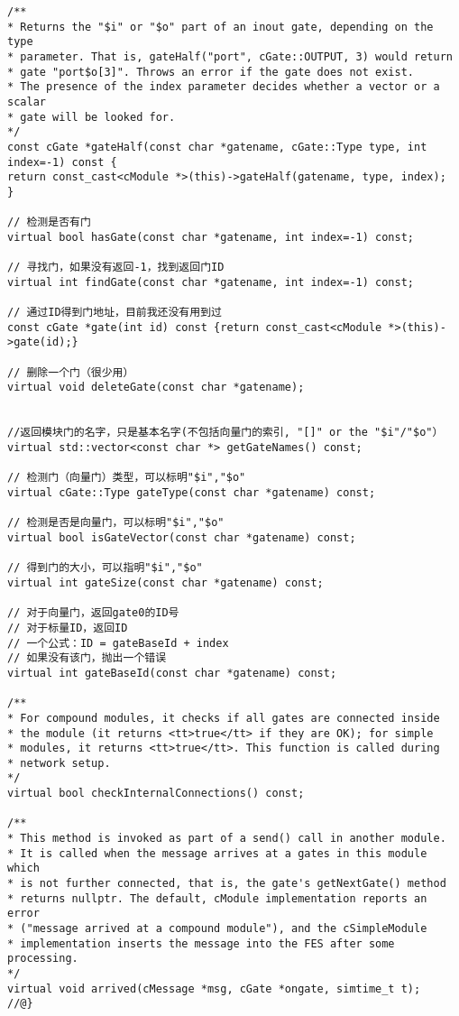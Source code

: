 \begin{lstlisting}
/**
* Returns the "$i" or "$o" part of an inout gate, depending on the type
* parameter. That is, gateHalf("port", cGate::OUTPUT, 3) would return
* gate "port$o[3]". Throws an error if the gate does not exist.
* The presence of the index parameter decides whether a vector or a scalar
* gate will be looked for.
*/
const cGate *gateHalf(const char *gatename, cGate::Type type, int index=-1) const {
return const_cast<cModule *>(this)->gateHalf(gatename, type, index);
}

// 检测是否有门
virtual bool hasGate(const char *gatename, int index=-1) const;

// 寻找门，如果没有返回-1，找到返回门ID
virtual int findGate(const char *gatename, int index=-1) const;

// 通过ID得到门地址，目前我还没有用到过
const cGate *gate(int id) const {return const_cast<cModule *>(this)->gate(id);}

// 删除一个门（很少用）
virtual void deleteGate(const char *gatename);


//返回模块门的名字，只是基本名字(不包括向量门的索引, "[]" or the "$i"/"$o"）
virtual std::vector<const char *> getGateNames() const;

// 检测门（向量门）类型，可以标明"$i","$o"
virtual cGate::Type gateType(const char *gatename) const;

// 检测是否是向量门，可以标明"$i","$o"
virtual bool isGateVector(const char *gatename) const;

// 得到门的大小，可以指明"$i","$o"
virtual int gateSize(const char *gatename) const;

// 对于向量门，返回gate0的ID号
// 对于标量ID，返回ID
// 一个公式：ID = gateBaseId + index
// 如果没有该门，抛出一个错误
virtual int gateBaseId(const char *gatename) const;

/**
* For compound modules, it checks if all gates are connected inside
* the module (it returns <tt>true</tt> if they are OK); for simple
* modules, it returns <tt>true</tt>. This function is called during
* network setup.
*/
virtual bool checkInternalConnections() const;

/**
* This method is invoked as part of a send() call in another module.
* It is called when the message arrives at a gates in this module which
* is not further connected, that is, the gate's getNextGate() method
* returns nullptr. The default, cModule implementation reports an error
* ("message arrived at a compound module"), and the cSimpleModule
* implementation inserts the message into the FES after some processing.
*/
virtual void arrived(cMessage *msg, cGate *ongate, simtime_t t);
//@}


\end{lstlisting}
